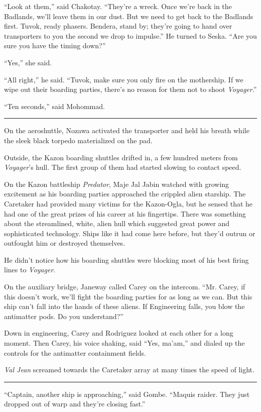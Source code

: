 \documentclass[twoside,letterpaper,12pt]{memoir}
\begin{document}
``Look at them,'' said Chakotay. ``They're a wreck. Once we're back in the Badlands, we'll leave them in our dust. But we need to get back to the Badlands first. Tuvok, ready phasers. Bendera, stand by; they're going to hand over transporters to you the second we drop to impulse.'' He turned to Seska. ``Are you sure you have the timing down?''

``Yes,'' she said.

``All right,'' he said. ``Tuvok, make sure you only fire on the mothership. If we wipe out their boarding parties, there's no reason for them not to shoot \textit{Voyager}.''

``Ten seconds,'' said Mohommad.

\fancybreak{\rule{3cm}{0.4 pt}}
On the aeroshuttle, Nozawa activated the transporter and held his breath while the sleek black torpedo materialized on the pad.

Outside, the Kazon boarding shuttles drifted in, a few hundred meters from \textit{Voyager}'s hull. The first group of them had started slowing to contact speed.

On the Kazon battleship \textit{Predator}, Maje Jal Jabin watched with growing excitement as his boarding parties approached the crippled alien starship. The Caretaker had provided many victims for the Kazon-Ogla, but he sensed that he had one of the great prizes of his career at his fingertips. There was something about the streamlined, white, alien hull which suggested great power and sophisticated technology. Ships like it had come here before, but they'd outrun or outfought him or destroyed themselves.

He didn't notice how his boarding shuttles were blocking most of his best firing lines to \textit{Voyager}.

On the auxiliary bridge, Janeway called Carey on the intercom. ``Mr. Carey, if this doesn't work, we'll fight the boarding parties for as long as we can. But this ship can't fall into the hands of these aliens. If Engineering falls, you blow the antimatter pods. Do you understand?''

Down in engineering, Carey and Rodriguez looked at each other for a long moment. Then Carey, his voice shaking, said ``Yes, ma'am,'' and dialed up the controls for the antimatter containment fields.

\textit{Val Jean} screamed towards the Caretaker array at many times the speed of light.

\fancybreak{\rule{3cm}{0.4 pt}}
``Captain, another ship is approaching,'' said Gombe. ``Maquis raider. They just dropped out of warp and they're closing fast.''
\end{document}
